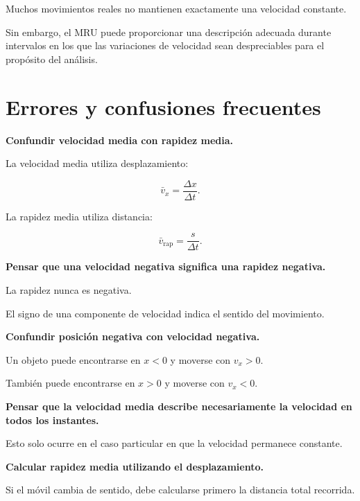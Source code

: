 Muchos movimientos reales no mantienen exactamente una velocidad constante.

Sin embargo, el MRU puede proporcionar una descripción adecuada durante
intervalos en los que las variaciones de velocidad sean despreciables para
el propósito del análisis.


\section{Errores y confusiones frecuentes}

\begin{errorfrecuente}
\textbf{Confundir velocidad media con rapidez media.}

La velocidad media utiliza desplazamiento:

\[ \bar{v}_x=\frac{\Delta x}{\Delta t}. \]

La rapidez media utiliza distancia:

\[ \bar{v}_{\text{rap}}=\frac{s}{\Delta t}. \]
\end{errorfrecuente}


\begin{errorfrecuente}
\textbf{Pensar que una velocidad negativa significa una rapidez negativa.}

La rapidez nunca es negativa.

El signo de una componente de velocidad indica el sentido del movimiento.
\end{errorfrecuente}


\begin{errorfrecuente}
\textbf{Confundir posición negativa con velocidad negativa.}

Un objeto puede encontrarse en \(x<0\) y moverse con \(v_x>0\).

También puede encontrarse en \(x>0\) y moverse con \(v_x<0\).
\end{errorfrecuente}


\begin{errorfrecuente}
\textbf{Pensar que la velocidad media describe necesariamente la velocidad
en todos los instantes.}

Esto solo ocurre en el caso particular en que la velocidad permanece
constante.
\end{errorfrecuente}


\begin{errorfrecuente}
\textbf{Calcular rapidez media utilizando el desplazamiento.}

Si el móvil cambia de sentido, debe calcularse primero la distancia total
recorrida.
\end{errorfrecuente}


